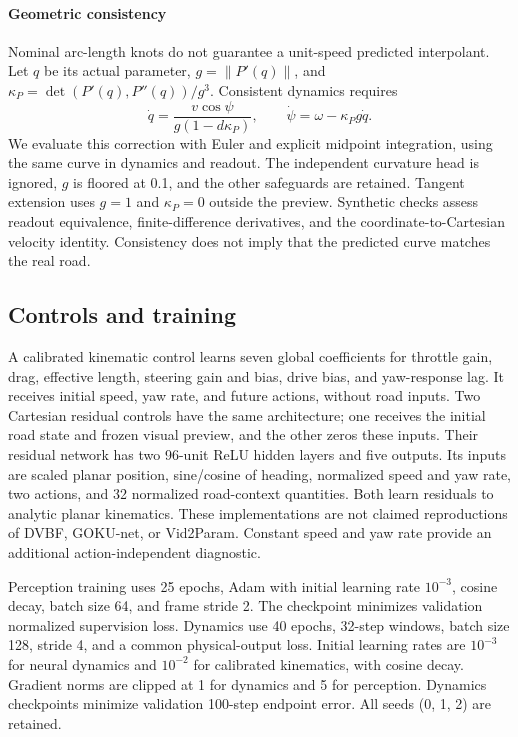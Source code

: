 \documentclass[preprint,12pt]{elsarticle}
\begin{document}
\paragraph{Geometric consistency}
Nominal arc-length knots do not guarantee a unit-speed predicted interpolant.
Let $q$ be its actual parameter, $g=\|P'(q)\|$, and
$\kappa_P=\det(P'(q),P''(q))/g^3$. Consistent dynamics requires
\begin{equation}
 \dot q=\frac{v\cos\psi}{g(1-d\kappa_P)},\qquad
 \dot\psi=\omega-\kappa_Pg\dot q.\label{eq:consistent_geometry}
\end{equation}
We evaluate this correction with Euler and explicit midpoint integration, using
the same curve in dynamics and readout. The independent curvature head is
ignored, $g$ is floored at 0.1, and the other safeguards are retained.
Tangent extension uses $g=1$ and $\kappa_P=0$ outside the preview.
Synthetic checks assess readout equivalence, finite-difference derivatives,
and the coordinate-to-Cartesian velocity identity. Consistency does not imply
that the predicted curve matches the real road.

\subsection{Controls and training}\label{sec:baselines}
A calibrated kinematic control learns seven global coefficients for throttle
gain, drag, effective length, steering gain and bias, drive bias, and yaw-response
lag. It receives initial speed, yaw rate, and future actions, without road inputs.
Two Cartesian residual controls have the same architecture; one receives the
initial road state and frozen visual preview, and the other zeros these inputs.
Their residual network has two 96-unit ReLU hidden layers and five outputs.
Its inputs are scaled planar position, sine/cosine of heading, normalized speed
and yaw rate, two actions, and 32 normalized road-context quantities. Both learn
residuals to analytic planar kinematics. These implementations are
not claimed reproductions of DVBF, GOKU-net, or Vid2Param. Constant speed and yaw
rate provide an additional action-independent diagnostic.

Perception training uses 25 epochs, Adam with initial learning rate $10^{-3}$,
cosine decay, batch size 64, and frame stride 2. The checkpoint minimizes
validation normalized supervision loss. Dynamics use 40 epochs, 32-step windows,
batch size 128, stride 4, and a common physical-output loss. Initial learning
rates are $10^{-3}$ for neural dynamics and $10^{-2}$ for calibrated kinematics,
with cosine decay. Gradient norms are clipped at 1 for dynamics and 5 for
perception. Dynamics checkpoints minimize validation 100-step endpoint error.
All seeds (0, 1, 2) are retained.
\end{document}
